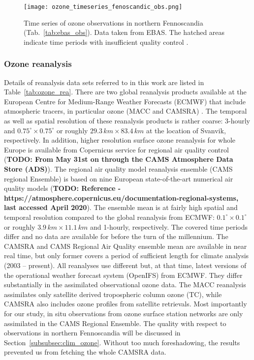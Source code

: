 \documentclass[bg, manuscript]{copernicus}
\begin{document}
\begin{figure*}[t]
  \texttt{[image: ozone\_timeseries\_fenoscandic\_obs.png]}
  \caption{Time series of ozone observations in northern Fennoscandia (Tab.~\ref{tab:ebas_obs}). Data taken from EBAS. The hatched areas indicate time periods with insufficient quality control \citep{NILU2003}.}
  \label{fig:ozone_timesseries_fenoscandic_obs}
\end{figure*}

\subsubsection{Ozone reanalysis}
\label{subsubsec:ozone_rea}

Details of reanalysis data sets referred to in this work are listed in Table~\ref{tab:ozone_rea}.
There are two global reanalysis products available at the European Centre for Medium-Range Weather Forecasts (ECMWF) that include atmospheric tracers, in particular ozone (MACC and CAMSRA) \citep{ACP:Inness2013, ACP:Inness2019}. The temporal as well as spatial resolution of these reanalysis products is rather coarse: 3-hourly and $0.75^\circ\times 0.75^\circ$ or roughly $29.3\,\unit{km}\times 83.4\,\unit{km}$ at the location of Svanvik, respectively. In addition, higher resolution surface ozone reanalysis for whole Europe is available from Copernicus service for regional air quality control ({\bf TODO: From May 31st on through the CAMS Atmosphere Data Store (ADS)}). The regional air quality model reanalysis ensemble (CAMS regional Ensemble) is based on nine European state-of-the-art numerical air quality models ({\bf TODO: Reference -  https://atmosphere.copernicus.eu/documentation-regional-systems, last accessed April 2020}). The ensemble mean is at fairly high spatial and temporal resolution compared to the global reanalysis from ECMWF: $0.1^\circ\times 0.1^\circ$ or roughly $3.9\,\unit{km}\times 11.1\,\unit{km}$ and 1-hourly, respectively. The covered time periods differ and no data are available for before the turn of the millennium. The CAMSRA and CAMS Regional Air Quality ensemble mean are available in near real time, but only former covers a period of sufficient length for climate analysis (2003 -- present). All reanalyses use different but, at that time, latest versions of the operational weather forecast system (OpenIFS) from ECMWF. They differ substantially in the assimilated observational ozone data. The MACC reanalysis assimilates only satellite derived tropospheric column ozone (TC), while CAMSRA also includes ozone profiles from satellite retrievals. Most importantly for our study, in situ observations from ozone surface station networks are only assimilated in the CAMS Regional Ensemble. The quality with respect to observations in northern Fennoscandia will be discussed in Section~\ref{subsubsec:clim_ozone}. Without too much foreshadowing, the results prevented us from fetching the whole CAMSRA data.
\end{document}
